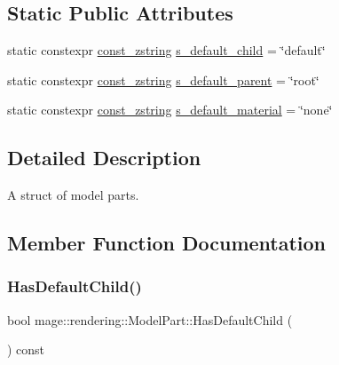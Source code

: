 \subsection*{Static Public Attributes}
\begin{DoxyCompactItemize}
\item 
static constexpr \mbox{\hyperlink{namespacemage_abfd9206dc607ceb5d13ec68bf075a5c0}{const\+\_\+zstring}} \mbox{\hyperlink{structmage_1_1rendering_1_1_model_part_a3571b142c7948d7ab5af699799c69b42}{s\+\_\+default\+\_\+child}} = \char`\"{}default\char`\"{}
\item 
static constexpr \mbox{\hyperlink{namespacemage_abfd9206dc607ceb5d13ec68bf075a5c0}{const\+\_\+zstring}} \mbox{\hyperlink{structmage_1_1rendering_1_1_model_part_ab6747ba3fd20c9f55f1d9bb7a64033e5}{s\+\_\+default\+\_\+parent}} = \char`\"{}root\char`\"{}
\item 
static constexpr \mbox{\hyperlink{namespacemage_abfd9206dc607ceb5d13ec68bf075a5c0}{const\+\_\+zstring}} \mbox{\hyperlink{structmage_1_1rendering_1_1_model_part_a833762db3fb81dd2086e9b89da158b12}{s\+\_\+default\+\_\+material}} = \char`\"{}none\char`\"{}
\end{DoxyCompactItemize}


\subsection{Detailed Description}
A struct of model parts. 

\subsection{Member Function Documentation}
\mbox{\label{structmage_1_1rendering_1_1_model_part_ab4118a267808c18556b0fa10949bcb0b}} 
\subsubsection{\texorpdfstring{Has\+Default\+Child()}{HasDefaultChild()}}
{\footnotesize\ttfamily bool mage\+::rendering\+::\+Model\+Part\+::\+Has\+Default\+Child (\begin{DoxyParamCaption}{ }\end{DoxyParamCaption}) const\hspace{0.3cm}{\ttfamily [noexcept]}}


